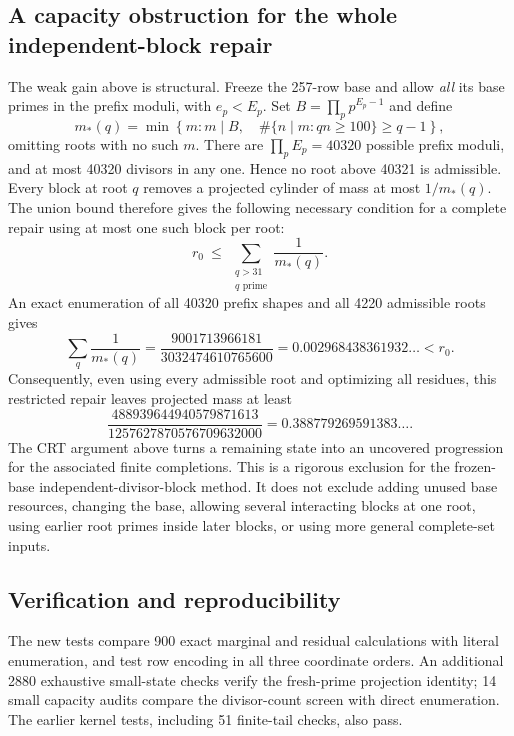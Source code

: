 \documentclass[11pt]{article}
\begin{document}
\subsection{A capacity obstruction for the whole independent-block repair}
The weak gain above is structural. Freeze the 257-row base and allow
\emph{all} its base primes in the prefix moduli, with $e_p<E_p$.
Set $B=\prod_p p^{E_p-1}$ and define
\[
 m_*(q)=\min\left\{m:m\mid B,\quad
       \#\{n\mid m:qn\ge100\}\ge q-1\right\},
\]
omitting roots with no such $m$. There are
$\prod_p E_p=40320$ possible prefix moduli, and at most 40320 divisors
in any one. Hence no root above 40321 is admissible.
Every block at root $q$ removes a projected cylinder of mass at most
$1/m_*(q)$. The union bound therefore gives the following necessary
condition for a complete repair using at most one such block per root:
\[
 r_0\ \le\ \sum_{\substack{q>31\\q\text{ prime}}}\frac1{m_*(q)}.
\]
An exact enumeration of all 40320 prefix shapes and all 4220 admissible
roots gives
\[
 \sum_q\frac1{m_*(q)}
 =\frac{9001713966181}{3032474610765600}
 =0.002968438361932\ldots <r_0.
\]
Consequently, even using every admissible root and optimizing all
residues, this restricted repair leaves projected mass at least
\[
 \frac{488939644940579871613}{1257627870576709632000}
 =0.388779269591383\ldots.
\]
The CRT argument above turns a remaining state into an uncovered
progression for the associated finite completions. This is a rigorous
exclusion for the frozen-base independent-divisor-block method. It does
not exclude adding unused base resources, changing the base, allowing
several interacting blocks at one root, using earlier root primes inside
later blocks, or using more general complete-set inputs.

\subsection{Verification and reproducibility}
The new tests compare 900 exact marginal and residual calculations with
literal enumeration, and test row encoding in all three coordinate
orders. An additional 2880 exhaustive small-state checks verify the
fresh-prime projection identity; 14 small capacity audits compare the
divisor-count screen with direct enumeration. The earlier kernel tests,
including 51 finite-tail checks, also pass.
\end{document}
